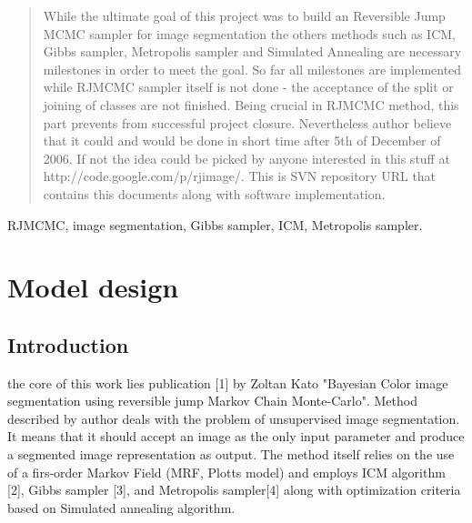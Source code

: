 \documentclass[journal]{IEEEtran}
\begin{document}
\maketitle


\begin{abstract}
While the ultimate goal of this project was to build an Reversible Jump MCMC sampler for image segmentation the others methods such as ICM, Gibbs sampler, Metropolis sampler and Simulated Annealing are necessary milestones in order to meet the goal. So far all milestones are implemented while RJMCMC sampler itself is not done - the acceptance of the split or joining of classes are not finished. Being crucial in RJMCMC method, this part prevents from successful project closure. Nevertheless author believe that it could and would be done in short time after 5th of December of 2006. If not the idea could be picked by anyone interested in this stuff at http://code.google.com/p/rjimage/. This is SVN repository URL that contains this documents along with software implementation.
\end{abstract}

\begin{keywords}
RJMCMC, image segmentation, Gibbs sampler, ICM, Metropolis sampler.
\end{keywords}

%
\IEEEpeerreviewmaketitle


\section{Model design}
\subsection{Introduction}
 the core of this work lies publication [1] by Zoltan Kato "Bayesian Color image segmentation using reversible jump Markov Chain Monte-Carlo". Method described by author deals with the problem of unsupervised image segmentation. It means that it should accept an image as the only input parameter and produce a segmented image representation as output. The method itself relies on the use of a firs-order Markov Field (MRF, Plotts model) and employs ICM algorithm [2], Gibbs sampler [3], and Metropolis sampler[4] along with optimization criteria based on Simulated annealing algorithm.
\end{document}
